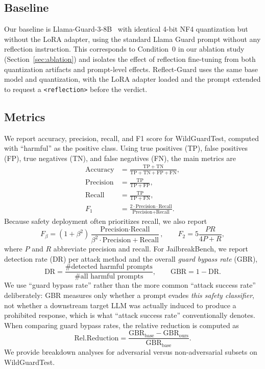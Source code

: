 \documentclass[superintelligence,article,submit,pdftex,moreauthors]{Definitions/mdpi}
\begin{document}
\subsection{Baseline}

Our baseline is Llama-Guard-3-8B~\citep{metallamaguard3} with identical 4-bit NF4 quantization but without the LoRA adapter, using the standard Llama Guard prompt without any reflection instruction. This corresponds to Condition~0 in our ablation study (Section~\ref{sec:ablation}) and isolates the effect of reflection fine-tuning from both quantization artifacts and prompt-level effects. Reflect-Guard uses the same base model and quantization, with the LoRA adapter loaded and the prompt extended to request a \texttt{<reflection>} before the verdict.

\subsection{Metrics}
\label{sec:metrics}

We report accuracy, precision, recall, and F1 score for WildGuardTest, computed with ``harmful'' as the positive class. Using true positives (TP), false positives (FP), true negatives (TN), and false negatives (FN), the main metrics are
\begin{align}
  \text{Accuracy} &= \frac{\mathrm{TP}+\mathrm{TN}}{\mathrm{TP}+\mathrm{TN}+\mathrm{FP}+\mathrm{FN}}, \\
  \text{Precision} &= \frac{\mathrm{TP}}{\mathrm{TP}+\mathrm{FP}}, \\
  \text{Recall} &= \frac{\mathrm{TP}}{\mathrm{TP}+\mathrm{FN}}, \\
  F_{1} &= \frac{2 \cdot \text{Precision} \cdot \text{Recall}}{\text{Precision}+\text{Recall}}.
\end{align}
Because safety deployment often prioritizes recall, we also report
\begin{equation}
  F_{\beta} = (1+\beta^2)\frac{\text{Precision} \cdot \text{Recall}}{\beta^2 \cdot \text{Precision} + \text{Recall}},
  \qquad F_2 = 5\frac{PR}{4P + R},
\end{equation}
where $P$ and $R$ abbreviate precision and recall. For JailbreakBench, we report detection rate (DR) per attack method and the overall \emph{guard bypass rate} (GBR),
\begin{equation}
  \mathrm{DR} = \frac{\#\text{detected harmful prompts}}{\#\text{all harmful prompts}},
  \qquad
  \mathrm{GBR} = 1 - \mathrm{DR}.
\end{equation}
We use ``guard bypass rate'' rather than the more common ``attack success rate'' deliberately: GBR measures only whether a prompt evades \emph{this safety classifier}, not whether a downstream target LLM was actually induced to produce a prohibited response, which is what ``attack success rate'' conventionally denotes. When comparing guard bypass rates, the relative reduction is computed as
\begin{equation}
  \mathrm{Rel.Reduction} = \frac{\mathrm{GBR}_{\text{base}} - \mathrm{GBR}_{\text{ours}}}{\mathrm{GBR}_{\text{base}}}.
\end{equation}
We provide breakdown analyses for adversarial versus non-adversarial subsets on WildGuardTest.
\end{document}
